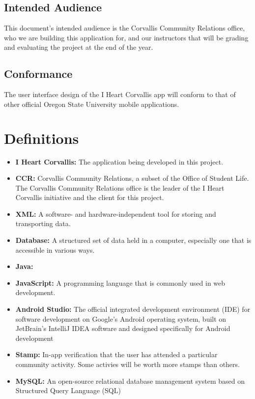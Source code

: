 \documentclass[draftclsnofoot, onecolumn, 10pt, compsoc]{IEEEtran}
\begin{document}
		\subsection{Intended Audience}
			This document's intended audience is the Corvallis Community Relations office, who we are building this application for, and our instructors that will be grading and evaluating the project at the end of the year.
		\subsection{Conformance}
			The user interface design of the I Heart Corvallis app will conform to that of other official Oregon State University mobile applications.
		\newpage
		
	\section{Definitions}
		\begin{itemize}
			\item \textbf{I Heart Corvallis:} The application being developed in this project.
			\item \textbf{CCR:} Corvallis Community Relations, a subset of the Office of Student Life. The Corvallis Community Relations office is the leader of the I Heart Corvallis initiative and the client for this project.
			\item \textbf{XML:} A software- and hardware-independent tool for storing and transporting data.
			\item \textbf{Database:} A structured set of data held in a computer, especially one that is accessible in various ways.
			\item \textbf{Java:}
			\item \textbf{JavaScript:} A programming language that is commonly used in web development.
			\item \textbf{Android Studio:} The official integrated development environment (IDE) for software development on Google's Android operating system, built on JetBrain's IntelliJ IDEA software and designed specifically for Android development
			\item \textbf{Stamp:} In-app verification that the user has attended a particular community activity. Some activies will be worth more stamps than others.
			\item \textbf{MySQL:} An open-source relational database management system based on Structured Query Language (SQL)
		\end{itemize}
		
\end{document}

